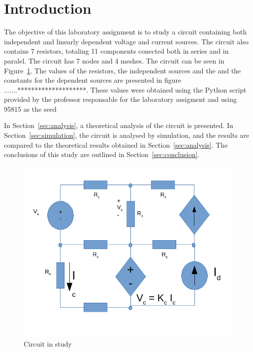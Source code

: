 \section{Introduction}
\label{sec:introduction}

The objective of this laboratory assignment is to study a circuit containing both independent and 
linearly dependent voltage and current sources. The circuit also contains 7 resistors, totaling 11 components conected both in series and in paralel.
The circuit has 7 nodes and 4 meshes. 
The circuit can be seen in Figure~\ref{fig:circuit_t1}.
The values of the resistors, the independent sources and the and the constants for the dependent 
sources are presented in figure .......********************. These values were obtained using the
Python script provided by the professor responsable for the laboratory assigment
and using 95815 as the seed 

In Section~\ref{sec:analysis}, a theoretical analysis of the circuit is
presented. In Section~\ref{sec:simulation}, the circuit is analysed by
simulation, and the results are compared to the theoretical results obtained in
Section~\ref{sec:analysis}. The conclusions of this study are outlined in
Section~\ref{sec:conclusion}.

\begin{figure}[h] \centering
\includegraphics[width=0.4\linewidth]{circuit_t1.pdf}
\caption{Circuit in study}
\label{fig:circuit_t1}
\end{figure}

